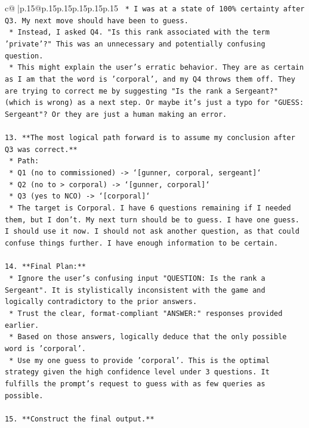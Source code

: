 \documentclass{article}
\begin{document}
{\begin{supertabular}{c@{$\;$}|p{.15\linewidth}@{}p{.15\linewidth}p{.15\linewidth}p{.15\linewidth}p{.15\linewidth}p{.15\linewidth}}
{{{\texttt{    *   I was at a state of 100\% certainty after Q3. My next move should have been to guess.} \\
\texttt{    *   Instead, I asked Q4. "Is this rank associated with the term 'private'?" This was an unnecessary and potentially confusing question.} \\
\texttt{    *   This might explain the user's erratic behavior. They are as certain as I am that the word is 'corporal', and my Q4 throws them off. They are trying to correct me by suggesting "Is the rank a Sergeant?" (which is wrong) as a next step. Or maybe it's just a typo for "GUESS: Sergeant"? Or they are just a human making an error.} \\
\\ 
\texttt{13. **The most logical path forward is to assume my conclusion after Q3 was correct.**} \\
\texttt{    *   Path:} \\
\texttt{        *   Q1 (no to commissioned) {-}> `{[}gunner, corporal, sergeant{]}`} \\
\texttt{        *   Q2 (no to > corporal) {-}> `{[}gunner, corporal{]}`} \\
\texttt{        *   Q3 (yes to NCO) {-}> `{[}corporal{]}`} \\
\texttt{    *   The target is Corporal. I have 6 questions remaining if I needed them, but I don't. My next turn should be to guess. I have one guess. I should use it now. I should not ask another question, as that could confuse things further. I have enough information to be certain.} \\
\\ 
\texttt{14. **Final Plan:**} \\
\texttt{    *   Ignore the user's confusing input "QUESTION: Is the rank a Sergeant". It is stylistically inconsistent with the game and logically contradictory to the prior answers.} \\
\texttt{    *   Trust the clear, format{-}compliant "ANSWER:" responses provided earlier.} \\
\texttt{    *   Based on those answers, logically deduce that the only possible word is 'corporal'.} \\
\texttt{    *   Use my one guess to provide 'corporal'. This is the optimal strategy given the high confidence level under 3 questions. It fulfills the prompt's request to guess with as few queries as possible.} \\
\\ 
\texttt{15. **Construct the final output.**} \\
}}}
\end{supertabular}}
\end{document}
